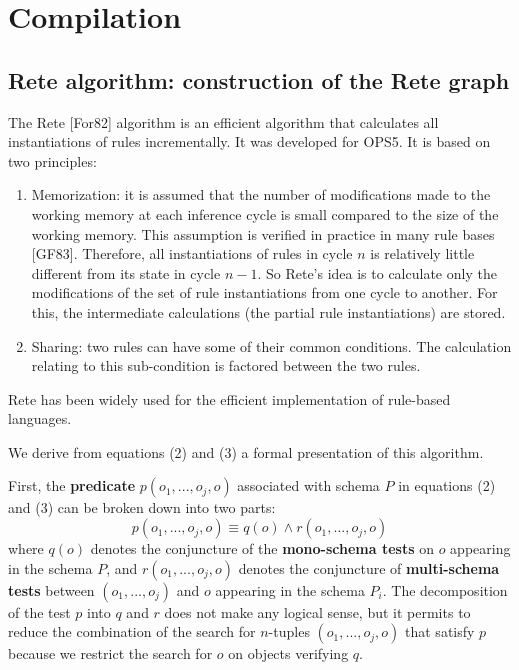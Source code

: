 \section{Compilation}

\subsection{Rete algorithm: construction of the Rete graph}

The Rete [For82] algorithm is an efficient algorithm that calculates all
instantiations of rules incrementally. It was developed for OPS5. It is based on two
principles:

\begin{enumerate}
	
	\item Memorization: it is assumed that the number of modifications made
	to the working memory at each inference cycle is small compared to the
	size of the working memory. This assumption is verified in practice in
	many rule bases [GF83].  Therefore, all instantiations
	of rules in cycle $n$ is relatively little different from its state in cycle $n - 1$.
	So Rete's idea is to calculate only the modifications of the set of
	rule instantiations from one cycle to another. For this, the intermediate calculations (the
	partial rule instantiations) are stored.  
	
	\item Sharing: two rules can have some of their common conditions.
	The calculation relating to this sub-condition is factored between the two rules.
	
\end{enumerate}

Rete has been widely used for the efficient implementation of rule-based languages.

We derive from equations (2) and (3) a formal presentation of this algorithm.

First, the \textbf{predicate} $p(o_1, ..., o_j, o)$ associated with schema $P$ in equations (2) and (3)
can be broken down into two parts:
\begin{equation}
p(o_1, ..., o_j, o) \equiv q(o) \wedge r(o_1, ..., o_j, o)
\nonumber
\end{equation}
where $q(o)$ denotes the conjuncture of the \textbf{mono-schema tests} on $o$ appearing in
the schema $P$, and $r(o_1, ..., o_j, o)$ denotes the conjuncture of \textbf{multi-schema tests} between
$(o_1, ..., o_j)$ and $o$ appearing in the schema $P_i$.  The decomposition of the test $p$ into $q$
and $r$ does not make any logical sense, but it permits to reduce the combination of
the search for $n$-tuples $(o_1, ..., o_j, o)$ that satisfy $p$ because we restrict the search for $o$
on objects verifying $q$.

